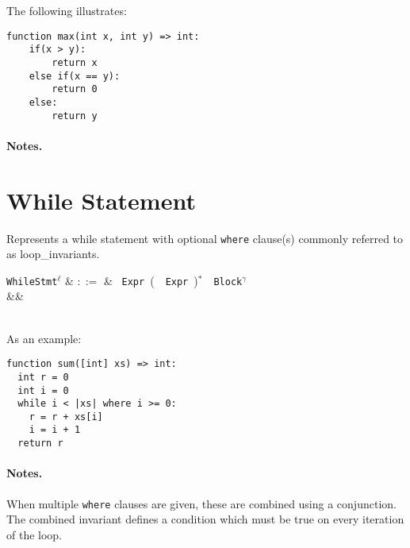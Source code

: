 \noindent The following illustrates:

\begin{lstlisting}
function max(int x, int y) => int:
    if(x > y):
        return x
    else if(x == y):
        return 0
    else:
        return y
\end{lstlisting}

\paragraph{Notes.} 


\section{While Statement}

Represents a while statement with optional \lstinline{where} clause(s) commonly referred to as \gls{loop_invariant}s.

\begin{syntax}
  \verb+WhileStmt+$^\ell$ & $::=$ & \ \verb+Expr+\ \big(\
  \ \verb+Expr+\ \big)$^*$\ \token{:}\ \verb+Block+$^\gamma$\ \\
&&\\
\\
\end{syntax}

\noindent As an example:

\begin{lstlisting}
function sum([int] xs) => int:
  int r = 0
  int i = 0
  while i < |xs| where i >= 0:
    r = r + xs[i]
    i = i + 1
  return r
\end{lstlisting}

\paragraph{Notes.}   When multiple \lstinline{where} clauses are
given, these are combined using a conjunction. The combined invariant
defines a condition which must be true on every iteration of the loop.


